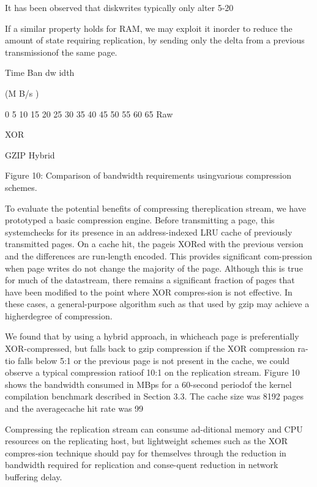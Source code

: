 It has been observed that diskwrites typically only alter 5-20%

If a similar property holds for RAM, we may exploit it inorder to reduce the amount of state requiring replication,
by sending only the delta from a previous transmissionof the same page.

Time
Ban
dw
idth

 (M
B/s
)

0
5
10
15
20
25
30
35
40
45
50
55
60
65 Raw

XOR

GZIP
Hybrid

Figure 10: Comparison of bandwidth requirements usingvarious compression schemes.

To evaluate the potential benefits of compressing thereplication stream, we have prototyped a basic compression engine. Before transmitting a page, this systemchecks for its presence in an address-indexed LRU cache
of previously transmitted pages. On a cache hit, the pageis XORed with the previous version and the differences
are run-length encoded. This provides significant com-pression when page writes do not change the majority
of the page. Although this is true for much of the datastream, there remains a significant fraction of pages that
have been modified to the point where XOR compres-sion is not effective. In these cases, a general-purpose
algorithm such as that used by gzip may achieve a higherdegree of compression.

We found that by using a hybrid approach, in whicheach page is preferentially XOR-compressed, but falls
back to gzip compression if the XOR compression ra-tio falls below 5:1 or the previous page is not present in
the cache, we could observe a typical compression ratioof 10:1 on the replication stream. Figure 10 shows the
bandwidth consumed in MBps for a 60-second periodof the kernel compilation benchmark described in Section 3.3. The cache size was 8192 pages and the averagecache hit rate was 99%

Compressing the replication stream can consume ad-ditional memory and CPU resources on the replicating
host, but lightweight schemes such as the XOR compres-sion technique should pay for themselves through the reduction in bandwidth required for replication and conse-quent reduction in network buffering delay.

